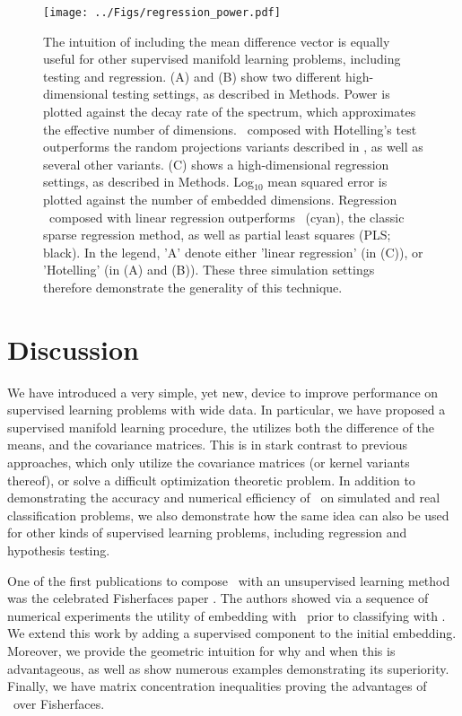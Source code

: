 \documentclass[10pt]{article}
\begin{document}
\begin{figure}
\centering
\texttt{[image: ../Figs/regression\_power.pdf]}
\caption{
The intuition of including the mean difference vector is equally useful for other supervised manifold learning problems, including testing and regression.
(A) and (B) show two different high-dimensional testing settings, as described in Methods.  Power is plotted against the decay rate of the spectrum, which approximates the effective number of dimensions.  \Lol~composed with Hotelling's test outperforms the random projections variants described in \cite{Lopes2011a}, as well as several other variants.
(C) shows a high-dimensional regression settings, as described in Methods.  Log$_{10}$ mean squared error is plotted against the number of embedded dimensions.  
Regression \Lol~composed with linear regression outperforms ~(cyan), the classic sparse regression method, as well as partial least squares (PLS; black).
In the legend, 'A' denote either 'linear regression' (in (C)), or 'Hotelling' (in (A) and (B)).
These three simulation settings therefore demonstrate the generality of this technique.
}
\label{fig:generalizations}
\end{figure}


\section*{Discussion}


We have introduced a very simple, yet new, device to improve performance on supervised learning problems with wide data.  In particular, we have proposed a supervised manifold learning procedure, the utilizes both the difference of the means, and the covariance matrices.  This is in stark contrast to previous approaches, which only utilize the covariance matrices (or kernel variants thereof), or solve a difficult optimization theoretic problem.  In addition to demonstrating the accuracy and numerical efficiency of \Lol~on simulated and real classification problems, we also demonstrate how the same idea can also be used for other kinds of supervised learning problems, including regression and hypothesis testing.

One of the first publications to compose \Fld~with an unsupervised learning method was the celebrated Fisherfaces paper \cite{Belhumeur1997a}.  The authors showed via a sequence of numerical experiments the utility of embedding with \Pca~prior to classifying with \Fld.  We extend this work by adding a supervised component to the initial embedding.  Moreover, we provide the geometric intuition for why and when this is advantageous, as well as show numerous examples demonstrating its superiority.  Finally, we have matrix concentration inequalities proving the advantages of \Lol~over Fisherfaces.  
\end{document}
